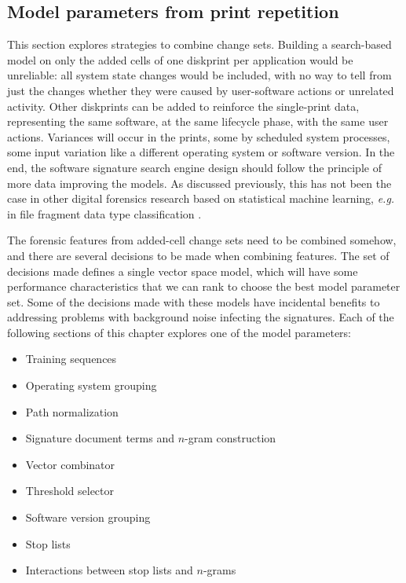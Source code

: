 \documentclass[11pt]{ucthesis}
\theoremstyle{plain}
\theoremstyle{definition}
\newcommand{\eg}{\emph{e.g.}\xspace}
\begin{document}
\subsection{Model parameters from print repetition}
\label{sec:modelparameters}

This section explores strategies to combine change sets.  Building a search-based model on only the added cells of one diskprint per application would be unreliable: all system state changes would be included, with no way to tell from just the changes whether they were caused by user-software actions or unrelated activity.  Other diskprints can be added to reinforce the single-print data, representing the same software, at the same lifecycle phase, with the same user actions.  Variances will occur in the prints, some by scheduled system processes, some input variation like a different operating system or software version.  In the end, the software signature search engine design should follow the principle of more data improving the models.  As discussed previously, this has not been the case in other digital forensics research based on statistical machine learning, \eg in file fragment data type classification \cite{garfinkel:dfrws10a}.

The forensic features from added-cell change sets need to be combined somehow, and there are several decisions to be made when combining features.  The set of decisions made defines a single vector space model, which will have some performance characteristics that we can rank to choose the best model parameter set.  Some of the decisions made with these models have incidental benefits to addressing problems with background noise infecting the signatures.  Each of the following sections of this chapter explores one of the model parameters:

\begin{itemize}
\item Training sequences
\item Operating system grouping
\item Path normalization
\item Signature document terms and $n$-gram construction
\item Vector combinator
\item Threshold selector
\item Software version grouping
\item Stop lists
\item Interactions between stop lists and $n$-grams
\end{itemize}
\end{document}
